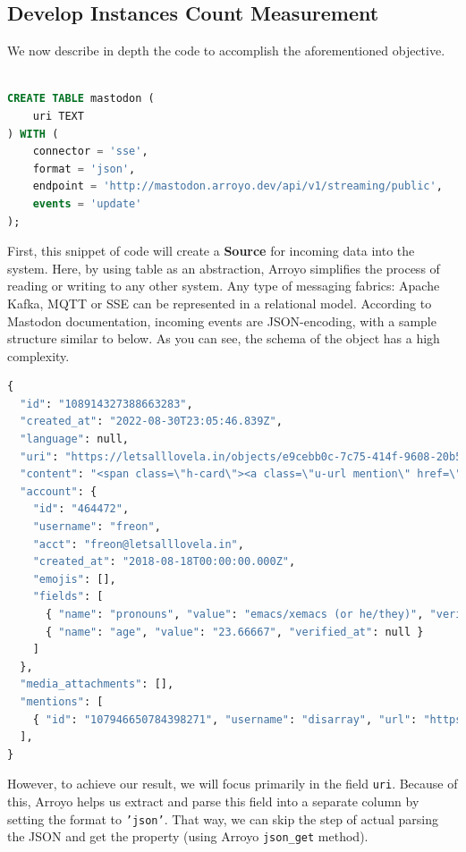 \subsection{Develop Instances Count Measurement}
We now describe in depth the code to accomplish the aforementioned objective.

\begin{lstlisting}[language=SQL]

CREATE TABLE mastodon (
    uri TEXT
) WITH (
    connector = 'sse',
    format = 'json',
    endpoint = 'http://mastodon.arroyo.dev/api/v1/streaming/public',
    events = 'update'
);

\end{lstlisting}

First, this snippet of code will create a \textbf{Source} for incoming data into the system. Here,
by using table as an abstraction, Arroyo simplifies the process of reading or writing to any other
system. Any type of messaging fabrics: Apache Kafka, MQTT or SSE can be represented in a relational
model. According to Mastodon documentation, incoming events are JSON-encoding, with a sample
structure similar to below. As you can see, the schema of the object has a high complexity.

\begin{lstlisting}[language=Python]
{
  "id": "108914327388663283",
  "created_at": "2022-08-30T23:05:46.839Z",
  "language": null,
  "uri": "https://letsalllovela.in/objects/e9cebb0c-7c75-414f-9608-20b5628e52d7",
  "content": "<span class=\"h-card\"><a class=\"u-url mention\" href=\"https://pl.nulled.red/users/disarray\" rel=\"nofollow noopener noreferrer\" target=\"_blank\">@<span>disarray</span></a></span> glad i was able to help",
  "account": {
    "id": "464472",
    "username": "freon",
    "acct": "freon@letsalllovela.in",
    "created_at": "2018-08-18T00:00:00.000Z",
    "emojis": [],
    "fields": [
      { "name": "pronouns", "value": "emacs/xemacs (or he/they)", "verified_at": null },
      { "name": "age", "value": "23.66667", "verified_at": null }
    ]
  },
  "media_attachments": [],
  "mentions": [
    { "id": "107946650784398271", "username": "disarray", "url": "https://pl.nulled.red/users/disarray", "acct": "disarray@pl.nulled.red" }
  ],
}
\end{lstlisting}

However, to achieve our result, we will focus primarily in the field \texttt{uri}. Because of this,
Arroyo helps us extract and parse this field into a separate column by setting the format to
\texttt{'json'}. That way, we can skip the step of actual parsing the JSON and get the property
(using Arroyo \texttt{json\_get} method).

